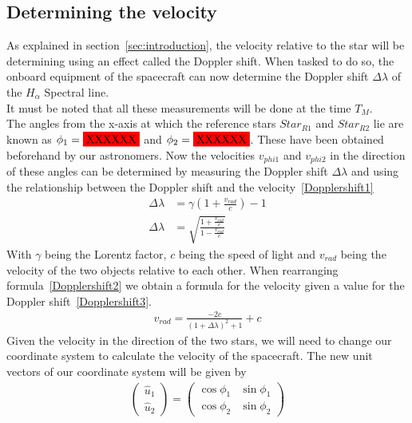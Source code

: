 \documentclass[reprint,english,notitlepage]{revtex4-2}
\begin{document}
\subsection{Determining the velocity}\label{subsec:determining-the-velocity}
As explained in section~\ref{sec:introduction}, the velocity relative to the star will be determining using an effect called the Doppler shift.
When tasked to do so, the onboard equipment of the spacecraft can now determine the Doppler shift $\Delta \lambda$ of the $H_{\alpha}$ Spectral line.\\
It must be noted that all these measurements will be done at the time $T_M$.\\
The angles from the x-axis at which the reference stars $Star_{R1}$ and $Star_{R2}$ lie are known as $\phi_1 = \colorbox{red}{XXXXXX}$ and $\phi_2 = \colorbox{red}{XXXXXX}$.
These have been obtained beforehand by our astronomers.
Now the velocities $v_{phi1}$ and $v_{phi2}$ in the direction of these angles can be determined by measuring the Doppler shift $\Delta \lambda$ and using the relationship between the Doppler shift and the velocity~\eqref{Dopplershift1}
\begin{align}
    \Delta \lambda &= \gamma \left(1 + \frac{v_{rad}}{c}\right) - 1 \label{Dopplershift1}\\
	\Delta \lambda &= \sqrt{\frac{1+\frac{v_{rad}}{c}}{1-\frac{v_{rad}}{c}}} \label{Dopplershift2}
\end{align}
With $\gamma$ being the Lorentz factor, $c$ being the speed of light and $v_{rad}$ being the velocity of the two objects relative to each other.
When rearranging formula~\eqref{Dopplershift2} we obtain a formula for the velocity given a value for the Doppler shift~\eqref{Dopplershift3}.
\begin{align}
    v_{rad} = \frac{-2c}{\left(1+\Delta\lambda \right)^2 +1} + c \label{Dopplershift3}
\end{align}
Given the velocity in the direction of the two stars, we will need to change our coordinate system to calculate the velocity of the spacecraft.
The new unit vectors of our coordinate system will be given by
\begin{align}\label{Coord_chg1}
\begin{pmatrix}
    \hat{u}_1 \\
	\hat{u}_2
\end{pmatrix} =
\begin{pmatrix}
    \cos \phi_1 & \sin \phi_1\\
	\cos \phi_2 & \sin \phi_2
\end{pmatrix}
\end{align}
\end{document}
